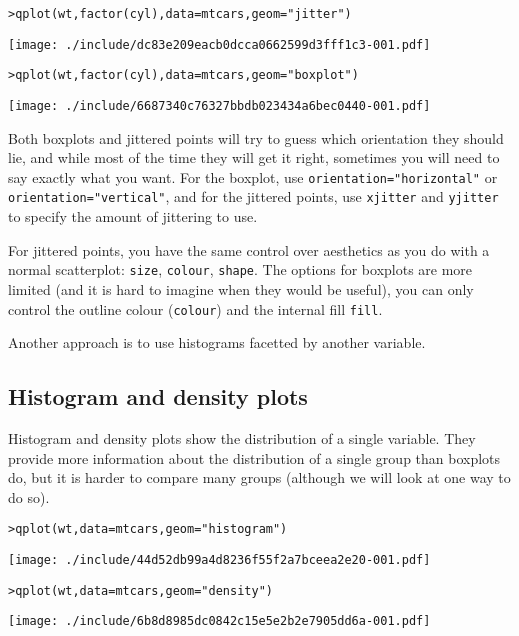 \begin{alltt}
> qplot(wt, factor(cyl), data = mtcars, geom = "jitter")
\end{alltt}
\texttt{[image: ./include/dc83e209eacb0dcca0662599d3fff1c3-001.pdf]}
\begin{alltt}

> qplot(wt, factor(cyl), data = mtcars, geom = "boxplot")
\end{alltt}
\texttt{[image: ./include/6687340c76327bbdb023434a6bec0440-001.pdf]}
\begin{alltt}

\end{alltt}

Both boxplots and jittered points will try to guess which orientation they should lie, and while most of the time they will get it right, sometimes you will need to say exactly what you want.  For the boxplot, use {\tt orientation="horizontal"} or {\tt orientation="vertical"}, and for the jittered points, use {\tt xjitter} and {\tt yjitter} to specify the amount of jittering to use. 

For jittered points, you have the same control over aesthetics as you do with a normal scatterplot: {\tt size}, {\tt colour}, {\tt shape}.  The options for boxplots are more limited (and it is hard to imagine when they would be useful), you can only control the outline colour ({\tt colour}) and the internal fill {\tt fill}.

Another approach is to use histograms facetted by another variable.

\subsection{Histogram and density plots}\label{sub:density}

Histogram and density plots show the distribution of a single variable.  They provide more information about the distribution of a single group than boxplots do, but it is harder to compare many groups (although we will look at one way to do so).

\begin{alltt}
> qplot(wt, data = mtcars, geom = "histogram")
\end{alltt}
\texttt{[image: ./include/44d52db99a4d8236f55f2a7bceea2e20-001.pdf]}
\begin{alltt}

> qplot(wt, data = mtcars, geom = "density")
\end{alltt}
\texttt{[image: ./include/6b8d8985dc0842c15e5e2b2e7905dd6a-001.pdf]}
\begin{alltt}

\end{alltt}

